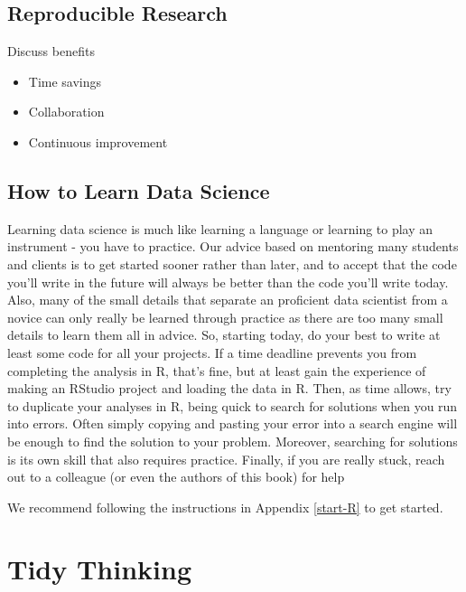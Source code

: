 \documentclass[
]{book}
\providecommand{\tightlist}{%
  \setlength{\itemsep}{0pt}\setlength{\parskip}{0pt}}
\begin{document}
\hypertarget{reproducible-research}{%
\section{Reproducible Research}\label{reproducible-research}}

Discuss benefits

\begin{itemize}
\tightlist
\item
  Time savings
\item
  Collaboration
\item
  Continuous improvement
\end{itemize}

\hypertarget{how-to-learn-data-science}{%
\section{How to Learn Data Science}\label{how-to-learn-data-science}}

Learning data science is much like learning a language or learning to play an instrument - you have to practice. Our advice based on mentoring many students and clients is to get started sooner rather than later, and to accept that the code you'll write in the future will always be better than the code you'll write today. Also, many of the small details that separate an proficient data scientist from a novice can only really be learned through practice as there are too many small details to learn them all in advice. So, starting today, do your best to write at least some code for all your projects. If a time deadline prevents you from completing the analysis in R, that's fine, but at least gain the experience of making an RStudio project and loading the data in R. Then, as time allows, try to duplicate your analyses in R, being quick to search for solutions when you run into errors. Often simply copying and pasting your error into a search engine will be enough to find the solution to your problem. Moreover, searching for solutions is its own skill that also requires practice. Finally, if you are really stuck, reach out to a colleague (or even the authors of this book) for help

We recommend following the instructions in Appendix \ref{start-R} to get started.

\hypertarget{tidy-thoughts}{%
\chapter{Tidy Thinking}\label{tidy-thoughts}}
\end{document}
